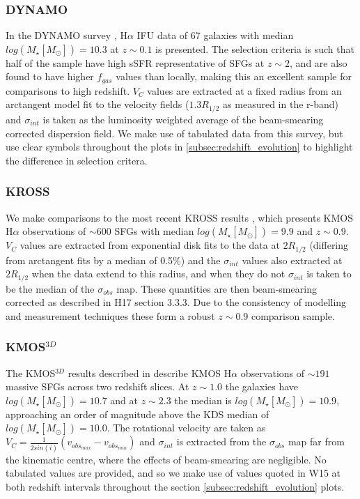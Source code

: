 \documentclass[fleqn,usenatbib]{mn2e}
\begin{document}
\subsubsection{DYNAMO}\label{subsubsec:DYNAMO}
In the DYNAMO survey \citep[G14]{Green2014}, H$\alpha$ IFU data of 67 galaxies with median $log(M_{\star}[M_{\odot}])=10.3$ at $z\sim0.1$ is presented.
The selection criteria is such that half of the sample have high sSFR representative of SFGs at $z\sim 2$, and are also found to have higher $f_{gas}$ values than locally, making this an excellent sample for comparisons to high redshift.
$V_{C}$ values are extracted at a fixed radius from an arctangent model fit to the velocity fields ($1.3R_{1/2}$ as measured in the r-band) and $\sigma_{int}$ is taken as the luminosity weighted average of the beam-smearing corrected dispersion field.
We make use of tabulated data from this survey, but use clear symbols throughout the plots in \cref{subsec:redshift_evolution} to highlight the difference in selection critera.

\subsubsection{KROSS}\label{subsubsec:KROSS}
We make comparisons to the most recent KROSS results \citep[H17]{Harrison2017}, which presents KMOS H$\alpha$ observations of $\sim600$ SFGs with median $log(M_{\star}[M_{\odot}])=9.9$ and $z\sim0.9$.
$V_{C}$ values are extracted from exponential disk fits to the data at $2R_{1/2}$ (differing from arctangent fits by a median of 0.5\%) and the $\sigma_{int}$ values also extracted at $2R_{1/2}$ when the data extend to this radius, and when they do not $\sigma_{int}$ is taken to be the median of the $\sigma_{obs}$ map.
These quantities are then beam-smearing corrected as described in H17 section 3.3.3. 
Due to the consistency of modelling and measurement techniques these form a robust $z\sim0.9$ comparison sample.

\subsubsection{KMOS$^{3D}$}\label{subsubsec:kmos_3d}
The KMOS$^{3D}$ results described in \cite[W15]{Wisnioski2015} describe KMOS H$\alpha$ observations of $\sim191$ massive SFGs across two redshift slices. 
At $z \sim 1.0$ the galaxies have $log(M_{\star}[M_{\odot}])=10.7$ and at $z \sim 2.3$ the median is $log(M_{\star}[M_{\odot}])=10.9$, approaching an order of magnitude above the KDS median of $log(M_{\star}[M_{\odot}])=10.0$.   The rotational velocity are taken as $V_{C} = \frac{1}{2sin(i)}(v_{obs_{max}} - v_{obs_{min}})$ and $\sigma_{int}$ is extracted from the $\sigma_{obs}$ map far from the kinematic centre, where the effects of beam-smearing are negligible.
No tabulated values are provided, and so we make use of values quoted in W15 at both redshift intervals throughout the section \cref{subsec:redshift_evolution} plots.
\end{document}
